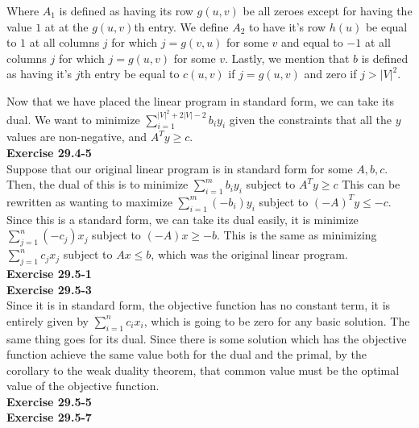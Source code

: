 \documentclass{article}
\begin{document}
Where $A_1$ is defined as having its row $g(u,v)$ be all zeroes except for having the value $1$ at at the $g(u,v)$th entry. We define $A_2$ to have it's row $h(u)$ be equal to $1$ at all columns $j$ for which $j=g(v,u)$ for some $v$ and equal to $-1$ at all columns $j$ for which $j= g(u,v)$ for some $v$. Lastly, we mention that $b$ is defined as having it's $j$th entry be equal to $c(u,v)$ if $j =g(u,v)$ and zero if $j > |V|^2$.

Now that we have placed the linear program in standard form, we can take its dual. We want to minimize $\sum_{i=1}^{|V|^2+2|V|-2} b_i y_i$ given the constraints that all the $y$ values are non-negative, and $A^T y \ge c$.\\



\noindent\textbf{Exercise 29.4-5}\\
Suppose that our original linear program is in standard form for some $A,b,c$. Then, the dual of this is to minimize $\sum_{i=1}^m b_i y_i$ subject to $A^T y \ge c$ This can be rewritten as wanting to maximize $\sum_{i=1}^m (-b_i) y_i$ subject to $(-A)^T y \le -c$. Since this is a standard form, we can take its dual easily, it is minimize $\sum_{j=1}^n (-c_j) x_j$ subject to $(-A)x \ge -b$. This is the same as minimizing $\sum_{j=1}^n c_j x_j$ subject to $Ax \le b$, which was the original linear program.\\

\noindent\textbf{Exercise 29.5-1}\\

\noindent\textbf{Exercise 29.5-3}\\
Since it is in standard form, the objective function has no constant term, it is entirely given by $\sum_{i=1}^n c_i x_i$, which is going to be zero for any basic solution. The same thing goes for its dual. Since there is some solution which has the objective function achieve the same value both for the dual and the primal, by the corollary to the weak duality theorem, that common value must be the optimal value of the objective function.\\

\noindent\textbf{Exercise 29.5-5}\\
\noindent\textbf{Exercise 29.5-7}\\
\end{document}
